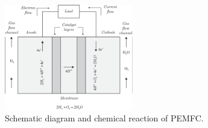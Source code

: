 \documentclass[11pt,a4paper]{article}
\numberwithin{equation}{section}
\theoremstyle{it}
\theoremstyle{definition}
\begin{document}
\begin{figure}[H]
	\centering
	\includegraphics[width = 0.5\textwidth, width = 320pt, angle = 0, keepaspectratio]{figures/pem_fuel_cell/pem_fuel_cell_0.eps}
	\captionsetup{width=0.5\textwidth}		
	\caption{Schematic diagram and chemical reaction of PEMFC.}
	\label{pem_fc_intro_0}
\end{figure}
\end{document}
